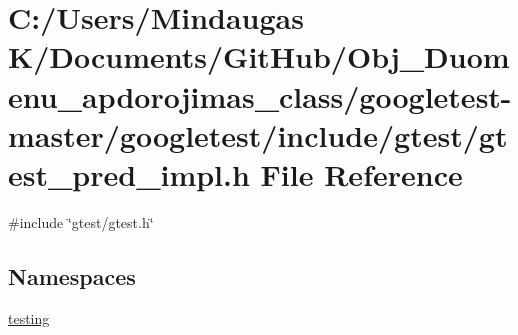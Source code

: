 \hypertarget{googletest-master_2googletest_2include_2gtest_2gtest__pred__impl_8h}{}\section{C\+:/\+Users/\+Mindaugas K/\+Documents/\+Git\+Hub/\+Obj\+\_\+\+Duomenu\+\_\+apdorojimas\+\_\+class/googletest-\/master/googletest/include/gtest/gtest\+\_\+pred\+\_\+impl.h File Reference}
\label{googletest-master_2googletest_2include_2gtest_2gtest__pred__impl_8h}
{\ttfamily \#include \char`\"{}gtest/gtest.\+h\char`\"{}}\newline
\subsection*{Namespaces}
\begin{DoxyCompactItemize}
\item 
 \mbox{\hyperlink{namespacetesting}{testing}}
\end{DoxyCompactItemize}
